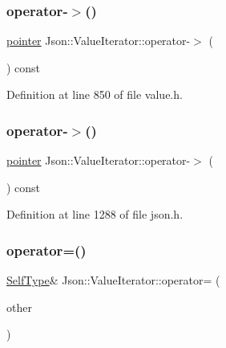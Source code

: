 \subsubsection{\texorpdfstring{operator-\/$>$()}{operator->()}\hspace{0.1cm}{\footnotesize\ttfamily [1/2]}}
{\footnotesize\ttfamily \hyperlink{class_json_1_1_value_iterator_acec45feb1ef1f3bf81240157d06d5432}{pointer} Json\+::\+Value\+Iterator\+::operator-\/$>$ (\begin{DoxyParamCaption}{ }\end{DoxyParamCaption}) const\hspace{0.3cm}{\ttfamily [inline]}}



Definition at line 850 of file value.\+h.

\hypertarget{class_json_1_1_value_iterator_a8dfc1603f92467591d524d0326f35534}{}\label{class_json_1_1_value_iterator_a8dfc1603f92467591d524d0326f35534} 
\subsubsection{\texorpdfstring{operator-\/$>$()}{operator->()}\hspace{0.1cm}{\footnotesize\ttfamily [2/2]}}
{\footnotesize\ttfamily \hyperlink{class_json_1_1_value_iterator_acec45feb1ef1f3bf81240157d06d5432}{pointer} Json\+::\+Value\+Iterator\+::operator-\/$>$ (\begin{DoxyParamCaption}{ }\end{DoxyParamCaption}) const\hspace{0.3cm}{\ttfamily [inline]}}



Definition at line 1288 of file json.\+h.

\hypertarget{class_json_1_1_value_iterator_a263912ab48a278202312cfddf636bc71}{}\label{class_json_1_1_value_iterator_a263912ab48a278202312cfddf636bc71} 
\subsubsection{\texorpdfstring{operator=()}{operator=()}\hspace{0.1cm}{\footnotesize\ttfamily [1/2]}}
{\footnotesize\ttfamily \hyperlink{class_json_1_1_value_iterator_base_a9d2a940d03ea06d20d972f41a89149ee}{Self\+Type}\& Json\+::\+Value\+Iterator\+::operator= (\begin{DoxyParamCaption}\item[{const \hyperlink{class_json_1_1_value_iterator_base_a9d2a940d03ea06d20d972f41a89149ee}{Self\+Type} \&}]{other }\end{DoxyParamCaption})}

